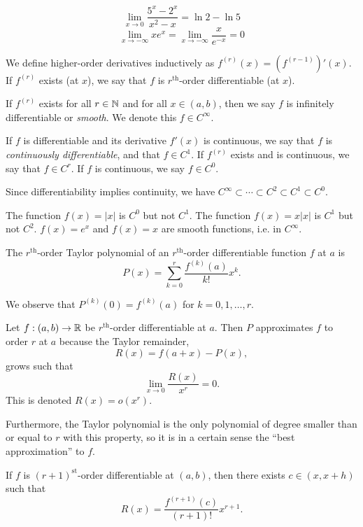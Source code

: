 \documentclass{article}
\begin{document}
\begin{example}
$$ \lim_{x\to 0} \frac{5^x - 2^x}{x^2-x} = \ln 2 - \ln 5$$
$$ \lim_{x\to -\infty} x e^x = \lim_{x\to -\infty} \frac{x}{e^{-x}} = 0$$
\end{example}

\begin{definition}
We define higher-order derivatives inductively as $f^{(r)}(x) = (f^{(r-1)})'(x)$. If $f^{(r)}$ exists (at $x$), we say that $f$ is $r^\text{th}$-order differentiable (at $x$). 
\end{definition}

\begin{definition}
If $f^{(r)}$ exists for all $r \in {\mathbb{N}}$ and for all $x \in (a,b)$, then we say $f$ is infinitely differentiable or \emph{smooth}. We denote this $f \in C^\infty$.
\end{definition}

\begin{definition}
If $f$ is differentiable and its derivative $f'(x)$ is continuous, we say that $f$ is \emph{continuously differentiable}, and that $f \in C^1$. If $f^{(r)}$ exists and is continuous, we say that $f \in C^r$. If $f$ is continuous, we say $f \in C^0$.
\end{definition}
Since differentiability implies continuity, we have $C^\infty \subset \cdots \subset C^2 \subset C^1 \subset C^0$.

\begin{example}
The function $f(x) = |x|$ is $C^0$ but not $C^1$. The function $f(x) = x|x|$ is $C^1$ but not $C^2$. $f(x) = e^x$ and $f(x) = x$ are smooth functions, i.e. in $C^\infty$.
\end{example}

\begin{definition}
The $r^\text{th}$-order Taylor polynomial of an $r^\text{th}$-order differentiable function $f$ at $a$ is 
\begin{equation*}
    P(x) = \sum_{k=0}^r \frac{f^{(k)}(a)}{k!} x^k.
\end{equation*}
\end{definition}

We observe that $P^{(k)}(0) = f^{(k)}(a)$ for $k=0,1,\ldots,r$.

\begin{theorem}
Let $f:(a,b) \to {\mathbb{R}}$ be $r^\text{th}$-order differentiable at $a$. 
Then $P$ approximates $f$ to order $r$ at $a$ because the Taylor remainder,
$$ R(x) = f(a+x) - P(x), $$
grows such that
$$ \lim_{x \to 0} \frac{R(x)}{x^r} = 0. $$
This is denoted $R(x) = o(x^r)$. 

Furthermore, the Taylor polynomial is the only polynomial of degree smaller than or equal to $r$ with this property, so it is in a certain sense the ``best approximation'' to $f$.

If $f$ is $(r+1)^\text{st}$-order differentiable at $(a,b)$, then there exists $c \in (x,x+h)$ such that
$$ R(x) = \frac{f^{(r+1)}(c)}{(r+1)!}x^{r+1} .$$
\end{theorem}
\end{document}
